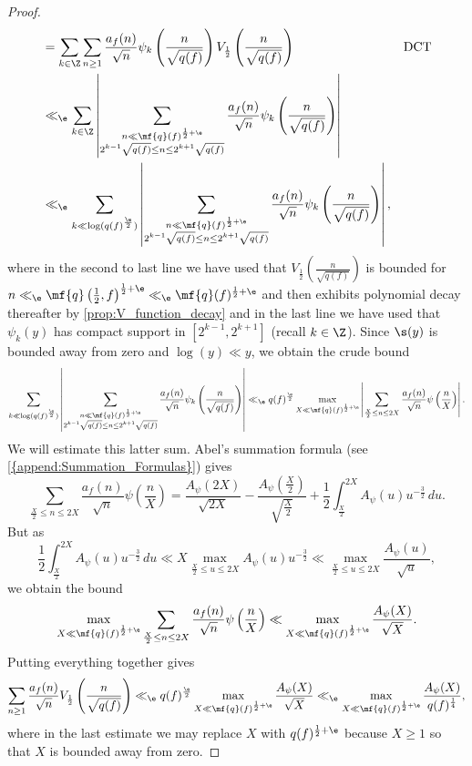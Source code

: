 \begin{proof}
\begin{align*}
        &= \sum_{k \in \Z}\sum_{n \ge 1}\frac{a_{f}(n)}{\sqrt{n}}\psi_{k}\left(\frac{n}{\sqrt{q(f)}}\right)V_{\frac{1}{2}}\left(\frac{n}{\sqrt{q(f)}}\right) && \text{DCT} \\
        &\ll_{\e} \sum_{k \in \Z}\left|\sum_{\substack{n \ll \mf{q}(f)^{\frac{1}{2}+\e} \\ 2^{k-1}\sqrt{q(f)} \le n \le 2^{k+1}\sqrt{q(f)}}}\frac{a_{f}(n)}{\sqrt{n}}\psi_{k}\left(\frac{n}{\sqrt{q(f)}}\right)\right| \\
        &\ll_{\e} \sum_{k \ll \log(q(f)^{\frac{\e}{2}})}\left|\sum_{\substack{n \ll \mf{q}(f)^{\frac{1}{2}+\e} \\ 2^{k-1}\sqrt{q(f)} \le n \le 2^{k+1}\sqrt{q(f)}}}\frac{a_{f}(n)}{\sqrt{n}}\psi_{k}\left(\frac{n}{\sqrt{q(f)}}\right)\right|,
      \end{align*}
      where in the second to last line we have used that $V_{\frac{1}{2}}\left(\frac{n}{\sqrt{q(f)}}\right)$ is bounded for $n \ll_{\e} \mf{q}\left(\frac{1}{2},f\right)^{\frac{1}{2}+\e} \ll_{\e} \mf{q}(f)^{\frac{1}{2}+\e}$ and then exhibits polynomial decay thereafter by \cref{prop:V_function_decay} and in the last line we have used that $\psi_{k}(y)$ has compact support in $[2^{k-1},2^{k+1}]$ (recall $k \in \Z$). Since $\s(y)$ is bounded away from zero and $\log(y) \ll y$, we obtain the crude bound
      \[
        \sum_{k \ll \log(q(f)^{\frac{\e}{2}})}\left|\sum_{\substack{n \ll \mf{q}(f)^{\frac{1}{2}+\e} \\ 2^{k-1}\sqrt{q(f)} \le n \le 2^{k+1}\sqrt{q(f)}}}\frac{a_{f}(n)}{\sqrt{n}}\psi_{k}\left(\frac{n}{\sqrt{q(f)}}\right)\right| \ll_{\e} q(f)^{\frac{\e}{2}}\max_{X \ll \mf{q}(f)^{\frac{1}{2}+\e}}\left|\sum_{\frac{X}{2} \le n \le 2X}\frac{a_{f}(n)}{\sqrt{n}}\psi\left(\frac{n}{X}\right)\right|.
      \]
      We will estimate this latter sum. Abel's summation formula (see \cref{{append:Summation_Formulas}}) gives
      \[
        \sum_{\frac{X}{2} \le n \le 2X}\frac{a_{f}(n)}{\sqrt{n}}\psi\left(\frac{n}{X}\right) = \frac{A_{\psi}(2X)}{\sqrt{2X}}-\frac{A_{\psi}\left(\frac{X}{2}\right)}{\sqrt{\frac{X}{2}}}+\frac{1}{2}\int_{\frac{X}{2}}^{2X}A_{\psi}(u)u^{-\frac{3}{2}}\,du.
      \]
      But as
      \[
        \frac{1}{2}\int_{\frac{X}{2}}^{2X}A_{\psi}(u)u^{-\frac{3}{2}}\,du \ll X\max_{\frac{X}{2} \le u \le 2X}A_{\psi}(u)u^{-\frac{3}{2}} \ll \max_{\frac{X}{2} \le u \le 2X}\frac{A_{\psi}(u)}{\sqrt{u}},
      \]
      we obtain the bound
      \[
        \max_{X \ll \mf{q}(f)^{\frac{1}{2}+\e}}\sum_{\frac{X}{2} \le n \le 2X}\frac{a_{f}(n)}{\sqrt{n}}\psi\left(\frac{n}{X}\right) \ll \max_{X \ll \mf{q}(f)^{\frac{1}{2}+\e}}\frac{A_{\psi}(X)}{\sqrt{X}}.
      \]
      Putting everything together gives
      \[
        \sum_{n \ge 1}\frac{a_{f}(n)}{\sqrt{n}}V_{\frac{1}{2}}\left(\frac{n}{\sqrt{q(f)}}\right) \ll_{\e} q(f)^{\frac{\e}{2}}\max_{X \ll \mf{q}(f)^{\frac{1}{2}+\e}}\frac{A_{\psi}(X)}{\sqrt{X}} \ll_{\e} \max_{X \ll \mf{q}(f)^{\frac{1}{2}+\e}}\frac{A_{\psi}(X)}{q(f)^{\frac{1}{4}}},
      \]
      where in the last estimate we may replace $X$ with $q(f)^{\frac{1}{2}+\e}$ because $X \ge 1$ so that $X$ is bounded away from zero.
    \end{proof}
